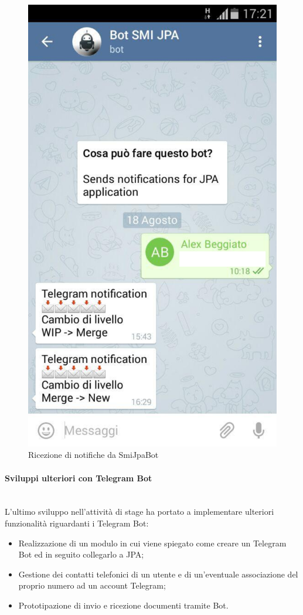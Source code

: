 \begin{figure}[H]%
\centering
\includegraphics[width=.5\columnwidth]{immagini/telegram-screen}
\caption{Ricezione di notifiche da SmiJpaBot}
\label{fig:screen-telegram}%
\end{figure}

\paragraph{Sviluppi ulteriori con Telegram Bot} \mbox{} \\

L'ultimo sviluppo nell'attività di stage ha portato a implementare ulteriori
funzionalità riguardanti i Telegram Bot:

\begin{itemize}
\item Realizzazione di un modulo in cui viene spiegato come creare un Telegram
  Bot ed in seguito collegarlo a JPA;
\item Gestione dei contatti telefonici di un utente e di un'eventuale
  associazione del proprio numero ad un account Telegram;
\item Prototipazione di invio e ricezione documenti tramite Bot.
\end{itemize}

